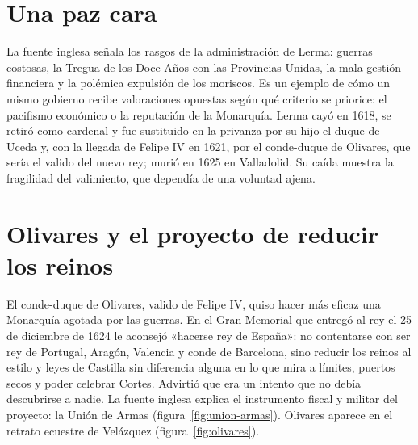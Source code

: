 \documentclass{book}
\begin{document}
\section{Una paz cara}

La fuente inglesa señala los rasgos de la administración de Lerma: guerras costosas, la Tregua de los Doce Años con las Provincias Unidas, la mala gestión financiera y la polémica expulsión de los moriscos. Es un ejemplo de cómo un mismo gobierno recibe valoraciones opuestas según qué criterio se priorice: el pacifismo económico o la reputación de la Monarquía. Lerma cayó en 1618, se retiró como cardenal y fue sustituido en la privanza por su hijo el duque de Uceda y, con la llegada de Felipe IV en 1621, por el conde-duque de Olivares, que sería el valido del nuevo rey; murió en 1625 en Valladolid. Su caída muestra la fragilidad del valimiento, que dependía de una voluntad ajena.


\section{Olivares y el proyecto de reducir los reinos}

El conde-duque de Olivares, valido de Felipe IV, quiso hacer más eficaz una Monarquía agotada por las guerras. En el Gran Memorial que entregó al rey el 25 de diciembre de 1624 le aconsejó «hacerse rey de España»: no contentarse con ser rey de Portugal, Aragón, Valencia y conde de Barcelona, sino reducir los reinos al estilo y leyes de Castilla sin diferencia alguna en lo que mira a límites, puertos secos y poder celebrar Cortes. Advirtió que era un intento que no debía descubrirse a nadie. La fuente inglesa explica el instrumento fiscal y militar del proyecto: la Unión de Armas (figura~\ref{fig:union-armas}). Olivares aparece en el retrato ecuestre de Velázquez (figura~\ref{fig:olivares}).

\end{document}
